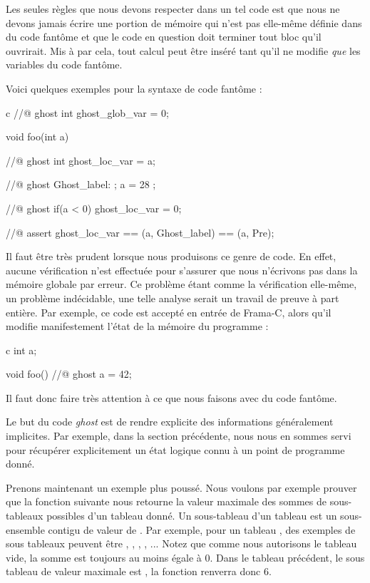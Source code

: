 \documentclass[middle]{zmdocument}
\begin{document}
Les seules règles que nous devons respecter dans un tel code est que nous ne 
devons jamais écrire une portion de mémoire qui n'est pas elle-même définie dans
du code fantôme et que le code en question doit terminer tout bloc qu'il ouvrirait.
Mis à par cela, tout calcul peut être inséré tant qu’il ne modifie \textit{que} les variables
du code fantôme.



Voici quelques exemples pour la syntaxe de code fantôme :



\begin{CodeBlock}{c}
//@ ghost int ghost_glob_var = 0;

void foo(int a){
  //@ ghost int ghost_loc_var = a;

  //@ ghost Ghost_label: ;
  a = 28 ;

  //@ ghost if(a < 0){ ghost_loc_var = 0; }

  //@ assert ghost_loc_var == \at(a, Ghost_label) == \at(a, Pre);
}
\end{CodeBlock}



Il faut être très prudent lorsque nous produisons ce genre de code. En effet, 
aucune vérification n'est effectuée pour s'assurer que nous n'écrivons pas dans
la mémoire globale par erreur. Ce problème étant comme la vérification elle-même, 
un problème indécidable, une telle analyse serait un travail de preuve à part 
entière. Par exemple, ce code est accepté en entrée de Frama-C, alors qu'il 
modifie manifestement l'état de la mémoire du programme :



\begin{CodeBlock}{c}
int a;

void foo(){
  //@ ghost a = 42;
}
\end{CodeBlock}



Il faut donc faire très attention à ce que nous faisons avec du code fantôme.





Le but du code \textit{ghost} est de rendre explicite des informations généralement 
implicites. Par exemple, dans la section précédente, nous nous en sommes servi
pour récupérer explicitement un état logique connu à un point de programme 
donné.



Prenons maintenant un exemple plus poussé. Nous voulons par exemple prouver que
la fonction suivante nous retourne la valeur maximale des sommes de sous-tableaux possibles d'un tableau donné. Un sous-tableau d'un tableau  est un
sous-ensemble contigu de valeur de . Par exemple, pour un tableau ,
des exemples de sous tableaux peuvent être \CodeInline{\{\}}, , 
, , ... Notez que comme nous autorisons le tableau vide,
la somme est toujours au moins égale à 0. Dans le tableau précédent, le sous 
tableau de valeur maximale est , la fonction renverra donc 6.
\end{document}
